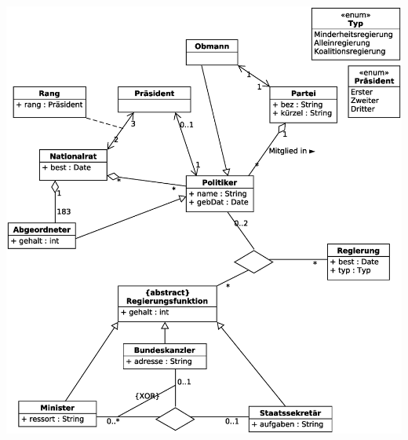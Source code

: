 \documentclass[a4paper, 12pt, margins=2cm]{homework}
\begin{document}
  \begin{solution}\hfill
    \begin{center}
      \includegraphics[scale=0.3]{Aufgabe5u6.eps}
    \end{center}
  \end{solution}
\end{document}
